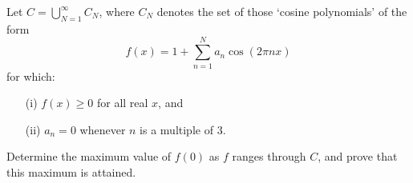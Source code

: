 Let $C = \bigcup_{N=1}^\infty C_N$, where $C_N$ denotes the set of those `cosine polynomials' of the form
\[
f(x) = 1 + \sum_{n=1}^N a_n \cos(2 \pi n x)
\]
for which:
\begin{enumerate}
\item[(i)]
$f(x) \geq 0$ for all real $x$, and
\item[(ii)]
$a_n = 0$ whenever $n$ is a multiple of $3$.
\end{enumerate}
Determine the maximum value of $f(0)$ as $f$ ranges through $C$, and 
prove that this maximum is attained.
